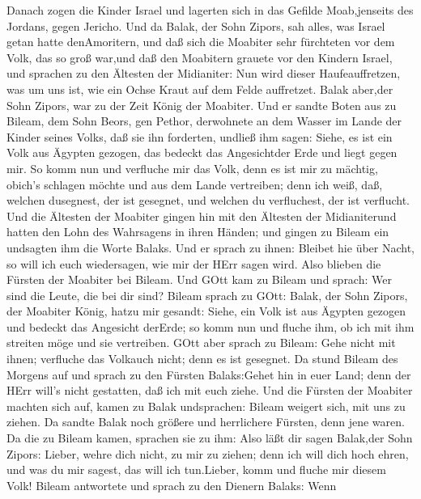  Danach zogen die Kinder Israel und lagerten sich in das
Gefilde Moab,jenseits des Jordans, gegen Jericho.  Und da
Balak, der Sohn Zipors, sah alles, was Israel getan hatte denAmoritern,
 und daß sich die Moabiter sehr fürchteten vor dem Volk, das
so groß war,und daß den Moabitern grauete vor den Kindern Israel,
 und sprachen zu den Ältesten der Midianiter: Nun wird
dieser Haufeauffretzen, was um uns ist, wie ein Ochse Kraut auf dem
Felde auffretzet. Balak aber,der Sohn Zipors, war zu der Zeit König der
Moabiter.  Und er sandte Boten aus zu Bileam, dem Sohn
Beors, gen Pethor, derwohnete an dem Wasser im Lande der Kinder seines
Volks, daß sie ihn forderten, undließ ihm sagen: Siehe, es ist ein Volk
aus Ägypten gezogen, das bedeckt das Angesichtder Erde und liegt gegen
mir.  So komm nun und verfluche mir das Volk, denn es ist
mir zu mächtig, obich's schlagen möchte und aus dem Lande vertreiben;
denn ich weiß, daß, welchen dusegnest, der ist gesegnet, und welchen du
verfluchest, der ist verflucht.  Und die Ältesten der
Moabiter gingen hin mit den Ältesten der Midianiterund hatten den Lohn
des Wahrsagens in ihren Händen; und gingen zu Bileam ein undsagten ihm
die Worte Balaks.  Und er sprach zu ihnen: Bleibet hie über
Nacht, so will ich euch wiedersagen, wie mir der HErr sagen wird. Also
blieben die Fürsten der Moabiter bei Bileam.  Und GOtt kam
zu Bileam und sprach: Wer sind die Leute, die bei dir sind?
 Bileam sprach zu GOtt: Balak, der Sohn Zipors, der
Moabiter König, hatzu mir gesandt:  Siehe, ein Volk ist aus
Ägypten gezogen und bedeckt das Angesicht derErde; so komm nun und
fluche ihm, ob ich mit ihm streiten möge und sie vertreiben.
 GOtt aber sprach zu Bileam: Gehe nicht mit ihnen;
verfluche das Volkauch nicht; denn es ist gesegnet.  Da
stund Bileam des Morgens auf und sprach zu den Fürsten Balaks:Gehet hin
in euer Land; denn der HErr will's nicht gestatten, daß ich mit euch
ziehe.  Und die Fürsten der Moabiter machten sich auf,
kamen zu Balak undsprachen: Bileam weigert sich, mit uns zu ziehen.
 Da sandte Balak noch größere und herrlichere Fürsten, denn
jene waren.  Da die zu Bileam kamen, sprachen sie zu ihm:
Also läßt dir sagen Balak,der Sohn Zipors: Lieber, wehre dich nicht, zu
mir zu ziehen;  denn ich will dich hoch ehren, und was du
mir sagest, das will ich tun.Lieber, komm und fluche mir diesem Volk!
 Bileam antwortete und sprach zu den Dienern Balaks: Wenn
